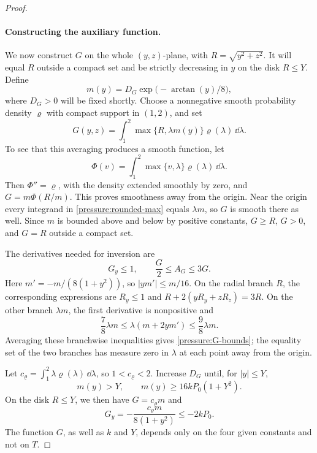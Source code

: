 \begin{proof}
\paragraph{Constructing the auxiliary function.}
We now construct \(G\) on the whole \((y,z)\)-plane, with
\(R=\sqrt{y^2+z^2}\).  It will equal \(R\) outside a compact set and
be strictly decreasing in \(y\) on the disk \(R\le Y\).  Define
\[
 m(y)=D_G\exp\bigl(-\arctan(y)/8\bigr),
\]
where \(D_G>0\) will be fixed shortly.  Choose a nonnegative smooth
probability density \(\varrho\) with compact support in \((1,2)\), and set
\begin{equation}\label{pressure:rounded-max}
 G(y,z)=\int_1^2\max\{R,\lambda m(y)\}\varrho(\lambda)\,\dd\lambda.
\end{equation}
To see that this averaging produces a smooth function, let
\[
 \Phi(v)=\int_1^2\max\{v,\lambda\}\varrho(\lambda)\,\dd\lambda.
\]
Then \(\Phi''=\varrho\), with the density extended smoothly by zero,
and \(G=m\Phi(R/m)\).  This proves smoothness away from the origin.
Near the origin every integrand in \eqref{pressure:rounded-max} equals
\(\lambda m\), so \(G\) is smooth there as well.  Since \(m\) is bounded
above and below by positive constants, \(G\ge R\), \(G>0\), and
\(G=R\) outside a compact set.

The derivatives needed for inversion are
\begin{equation}\label{pressure:G-bounds}
 G_y\le1,\qquad \frac G2\le A_G\le3G.
\end{equation}
Here \(m'=-m/(8(1+y^2))\), so \(|ym'|\le m/16\).
On the radial branch \(R\), the corresponding expressions are
\(R_y\le1\) and \(R+2(yR_y+zR_z)=3R\).
On the other branch \(\lambda m\), the first derivative is nonpositive
and
\[
 \frac78\lambda m
 \le\lambda(m+2ym')\le\frac98\lambda m.
\]
Averaging these branchwise inequalities gives \eqref{pressure:G-bounds};
the equality set of the two branches has measure zero in \(\lambda\)
at each point away from the origin.

Let \(c_{\varrho}=\int_1^2\lambda\varrho(\lambda)\,\dd\lambda\), so
\(1<c_{\varrho}<2\).  Increase \(D_G\) until, for \(|y|\le Y\),
\[
 m(y)>Y,\qquad m(y)\ge16kP_0(1+Y^2).
\]
On the disk \(R\le Y\), we then have \(G=c_{\varrho}m\) and
\begin{equation}\label{pressure:G-inner}
 G_y=-\frac{c_{\varrho}m}{8(1+y^2)}\le-2kP_0.
\end{equation}
The function \(G\), as well as \(k\) and \(Y\), depends only on the four
given constants and not on \(T\).


\end{proof}
